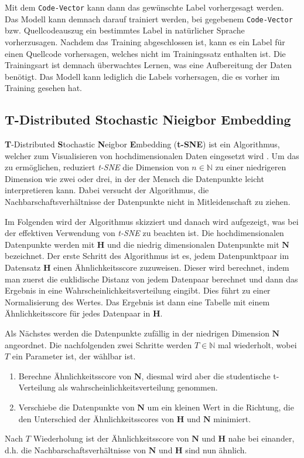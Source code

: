 \documentclass[12pt,letterpaper,ngerman]{article}
\begin{document}
Mit dem \verb|Code-Vector| kann dann das gewünschte Label vorhergesagt 
werden. Das Modell kann demnach darauf trainiert werden, bei gegebenem 
\verb|Code-Vector| bzw. Quellcodeauszug ein bestimmtes Label in 
natürlicher Sprache vorherzusagen. Nachdem das Training abgeschlossen 
ist, kann es ein Label für einen Quellcode vorhersagen, welches nicht 
im Trainingssatz enthalten ist. 
Die Trainingsart ist demnach überwachtes Lernen, was eine Aufbereitung der
Daten benötigt. Das Modell kann lediglich die Labels vorhersagen, die es 
vorher im Training gesehen hat.

\pagebreak

\subsection{ T-Distributed Stochastic Nieigbor Embedding}
{\bf T}-Distributed {\bf S}tochastic {\bf N}eigbor {\bf E}mbedding
({\bf  t-SNE}) ist ein Algorithmus, welcher zum Visualisieren von
hochdimensionalen Daten eingesetzt wird
\cite{JMLR:v9:vandermaaten08a}. Um das zu ermöglichen,
reduziert  \textit{t-SNE} die Dimension von $n \in \mathbb{N}$ zu einer niedrigeren 
Dimension wie zwei oder drei, in der der Mensch die Datenpunkte leicht 
interpretieren kann. Dabei versucht der Algorithmus, die
Nachbarschaftsverhältnisse der Datenpunkte nicht in Mitleidenschaft zu 
ziehen.

Im Folgenden wird der Algorithmus skizziert und danach wird aufgezeigt,
was bei der effektiven Verwendung von  \textit{t-SNE} zu beachten ist. Die
hochdimensionalen Datenpunkte werden mit $\mathbf{H}$ und die niedrig 
dimensionalen Datenpunkte mit $\mathbf{N}$ bezeichnet. Der erste Schritt 
des Algorithmus ist es, jedem Datenpunktpaar im Datensatz $\mathbf{H}$
einen Ähnlichkeitsscore zuzuweisen. Dieser wird berechnet, indem man 
zuerst die euklidische Distanz von jedem Datenpaar berechnet und dann das 
Ergebnis in eine Wahrscheinlichkeitsverteilung eingibt. Dies führt zu
einer Normalisierung des Wertes. Das Ergebnis ist dann eine Tabelle mit 
einem Ähnlichkeitsscore für jedes Datenpaar in $\mathbf{H}$. 

Als Nächstes werden die Datenpunkte zufällig in der niedrigen Dimension $\mathbf{N}$
angeordnet. Die nachfolgenden zwei Schritte werden $T\in \mathbb{N}$ 
mal wiederholt, wobei $T$ ein Parameter ist, der wählbar ist.
\begin{enumerate}
  \item Berechne Ähnlichkeitsscore von $\mathbf{N}$, diesmal wird aber die
      studentische t-Verteilung als wahrscheinlichkeitsverteilung genommen. 
  \item Verschiebe die Datenpunkte von $\mathbf{N}$ um ein kleinen Wert in
    die Richtung, die den Unterschied der Ähnlichkeitsscores von $\mathbf{H}$
    und $\mathbf{N}$ minimiert.
\end{enumerate}
Nach $T$ Wiederholung ist der Ähnlichkeitsscore von $\mathbf{N}$ und 
$\mathbf{H}$ nahe bei einander, d.h. die Nachbarschaftsverhältnisse 
von $\mathbf{N}$ und $\mathbf{H}$ sind nun ähnlich.
\end{document}
